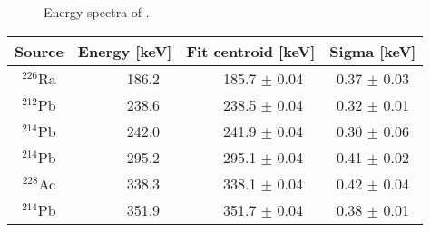 				\begin{figure}
					\centering
					\caption[Energy spectra of .]
					{Energy spectra of .}
					\label{fig:PPC2EnergySpectra}
				\end{figure}	
	
				\begin{table}
					\centering
					\begin{tabular}{  c  r  r  c  }
					\toprule
					{\bf Source} & {\bf Energy [keV]} & {\bf Fit centroid [keV]} & {\bf Sigma [keV]} \\  
					\midrule
					$^{226}$Ra     & 186.2     ~ & 185.7      ${\pm}$ 0.04       ~ & 0.37       ${\pm}$ 0.03       \\
					$^{212}$Pb     & 238.6     ~ & 238.5      ${\pm}$ 0.04       ~ & 0.32       ${\pm}$ 0.01       \\
					$^{214}$Pb     & 242.0     ~ & 241.9      ${\pm}$ 0.04       ~ & 0.30       ${\pm}$ 0.06       \\
					$^{214}$Pb     & 295.2     ~ & 295.1      ${\pm}$ 0.04       ~ & 0.41       ${\pm}$ 0.02       \\
					$^{228}$Ac     & 338.3     ~ & 338.1      ${\pm}$ 0.04       ~ & 0.42       ${\pm}$ 0.04       \\
					$^{214}$Pb     & 351.9     ~ & 351.7      ${\pm}$ 0.04       ~ & 0.38       ${\pm}$ 0.01       \\

\end{tabular}
\end{table}
